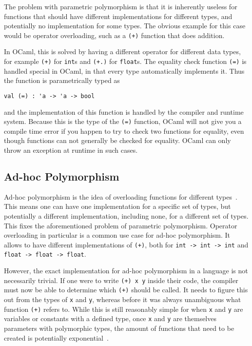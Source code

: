 The problem with parametric polymorphism is that it is inherently useless for functions that should have different implementations for different types, and potentially no implementation for some types. The obvious example for this case would be operator overloading, such as a \verb|(+)| function that does addition.

In OCaml, this is solved by having a different operator for different data types, for example \verb|(+)| for \verb|int|s and \verb|(+.)| for \verb|float|s. The equality check function \verb|(=)| is handled special in OCaml, in that every type automatically implements it. Thus the function is parametrically typed as
\begin{verbatim}
val (=) : 'a -> 'a -> bool
\end{verbatim}
and the implementation of this function is handled by the compiler and runtime system. Because this is the type of the \verb|(=)| function, OCaml will not give you a compile time error if you happen to try to check two functions for equality, even though functions can not generally be checked for equality. OCaml can only throw an exception at runtime in such cases.

\subsection{Ad-hoc Polymorphism}

Ad-hoc polymorphism is the idea of overloading functions for different types~\cite[Chapter~23.2]{pierce-types}. This means one can have one implementation for a specific set of types, but potentially a different implementation, including none, for a different set of types. This fixes the aforementioned problem of parametric polymorphism. Operator overloading in particular is a common use case for ad-hoc polymorphism. It allows to have different implementations of \verb|(+)|, both for \verb|int -> int -> int| and \verb|float -> float -> float|.

However, the exact implementation for ad-hoc polymorphism in a language is not necessarily trivial. If one were to write \verb|(+) x y| inside their code, the compiler must now be able to determine which \verb|(+)| should be called. It needs to figure this out from the types of \verb|x| and \verb|y|, whereas before it was always unambiguous what function \verb|(+)| refers to. While this is still reasonably simple for when \verb|x| and \verb|y| are variables or constants with a defined type, once \verb|x| and \verb|y| are themselves parameters with polymorphic types, the amount of functions that need to be created is potentially exponential~\cite{type-classes-original}.

